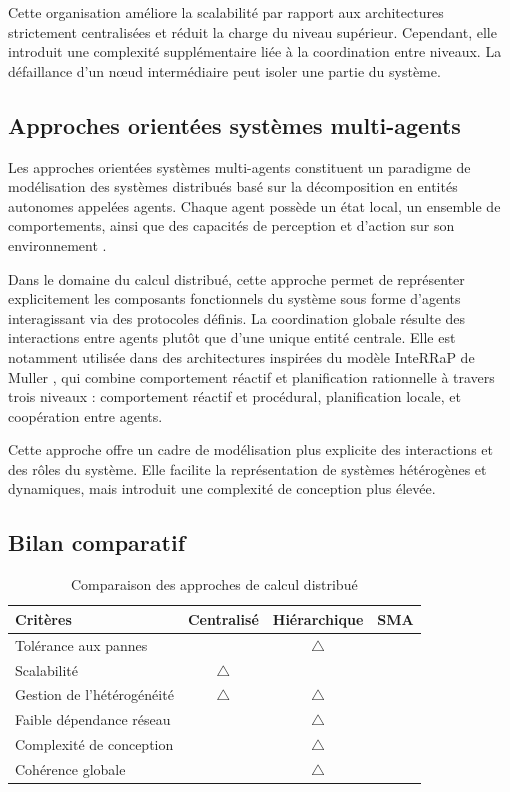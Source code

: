 \documentclass[12pt,a4paper]{report}
\newcommand{\ccheck}{\textcolor{green!60!black}{\ding{51}}}
\newcommand{\ctri}{\textcolor{orange!80!black}{$\triangle$}}
\newcommand{\ccross}{\textcolor{red!70!black}{\ding{55}}}
\begin{document}
Cette organisation améliore la scalabilité par rapport aux architectures strictement centralisées et réduit la charge du niveau supérieur. Cependant, elle introduit une complexité supplémentaire liée à la coordination entre niveaux. La défaillance d'un nœud intermédiaire peut isoler une partie du système.

\subsection{Approches orientées systèmes multi-agents}

Les approches orientées systèmes multi-agents constituent un paradigme de modélisation des systèmes distribués basé sur la décomposition en entités autonomes appelées agents. Chaque agent possède un état local, un ensemble de comportements, ainsi que des capacités de perception et d'action sur son environnement \cite{wooldridge, chapitre1}.

Dans le domaine du calcul distribué, cette approche permet de représenter explicitement les composants fonctionnels du système sous forme d'agents interagissant via des protocoles définis. La coordination globale résulte des interactions entre agents plutôt que d'une unique entité centrale. Elle est notamment utilisée dans des architectures inspirées du modèle InteRRaP de Muller \cite{chapitre2}, qui combine comportement réactif et planification rationnelle à travers trois niveaux : comportement réactif et procédural, planification locale, et coopération entre agents.

Cette approche offre un cadre de modélisation plus explicite des interactions et des rôles du système. Elle facilite la représentation de systèmes hétérogènes et dynamiques, mais introduit une complexité de conception plus élevée.

\subsection{Bilan comparatif}

\begin{table}[H]
\centering
\renewcommand{\arraystretch}{1.3}
\begin{tabular}{|l|c|c|c|}
\hline
\textbf{Critères} & \textbf{Centralisé} & \textbf{Hiérarchique} & \textbf{SMA} \\
\hline
Tolérance aux pannes       & \ccross & \ctri    & \ccheck \\
\hline
Scalabilité                & \ctri   & \ccheck  & \ccheck \\
\hline
Gestion de l'hétérogénéité & \ctri   & \ctri    & \ccheck \\
\hline
Faible dépendance réseau   & \ccross & \ctri    & \ccheck \\
\hline
Complexité de conception   & \ccheck & \ctri    & \ccross \\
\hline
Cohérence globale          & \ccheck & \ctri    & \ccheck \\
\hline
\end{tabular}
\caption{Comparaison des approches de calcul distribué}
\end{table}
\end{document}
